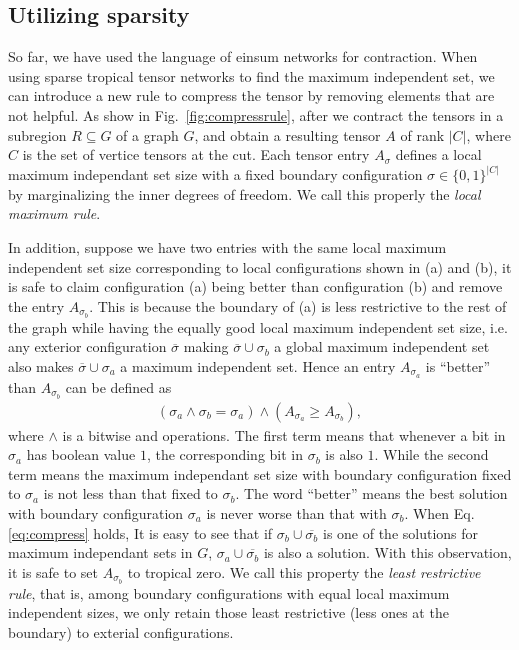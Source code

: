 \documentclass{article}
\newcommand{\<}{\langle}
\renewcommand{\>}{\rangle}
\newcommand{\Fig}[1]{Fig.~\ref{#1}}
\theoremstyle{definition}\newtheorem{definition}{\textit{Definition}}
\begin{document}
\subsection{Utilizing sparsity}
So far, we have used the language of einsum networks for contraction.
When using sparse tropical tensor networks to find the maximum independent set, we can introduce a new rule to compress the tensor by removing elements that are not helpful.
As show in \Fig{fig:compressrule}, after we contract the tensors in a subregion $R \subseteq G$ of a graph $G$, and obtain a resulting tensor $A$ of rank $|C|$, where $C$ is the set of vertice tensors at the cut.
Each tensor entry $A_{\sigma}$ defines a local maximum independant set size with a fixed boundary configuration $\sigma \in \{0,1\}^{|C|}$ by marginalizing the inner degrees of freedom.
We call this properly the \textit{local maximum rule}.

In addition, suppose we have two entries with the same local maximum independent set size corresponding to local configurations shown in (a) and (b), it is safe to claim configuration (a) being better than configuration (b) and remove the entry $A_{\sigma_b}$.
This is because the boundary of (a) is less restrictive to the rest of the graph while having the equally good local maximum independent set size, 
i.e. any exterior configuration $\overline{\sigma}$ making $\overline{\sigma} \cup \sigma_b$ a global maximum independent set also makes $\overline{\sigma} \cup \sigma_a$ a maximum independent set.
Hence an entry $A_{\sigma_a}$ is ``better'' than $A_{\sigma_b}$ can be defined as
\begin{align}
(\sigma_a \land \sigma_b = \sigma_a) \land (A_{\sigma_a} \geq A_{\sigma_b}),\label{eq:compress}
\end{align}
where $\land$ is a bitwise and operations.
The first term means that whenever a bit in $\sigma_a$ has boolean value $1$, the corresponding bit in $\sigma_b$ is also $1$.
While the second term means the maximum independant set size with boundary configuration fixed to $\sigma_a$ is not less than that fixed to $\sigma_b$.
The word ``better'' means the best solution with boundary configuration $\sigma_a$ is never worse than that with $\sigma_b$.
When Eq. \ref{eq:compress} holds, It is easy to see that if $\sigma_b \cup \overline{\sigma_b}$ is one of the solutions for maximum independant sets in $G$, $\sigma_a \cup \overline{\sigma_b}$ is also a solution.
With this observation, it is safe to set $A_{\sigma_b}$ to tropical zero.
We call this property the \textit{least restrictive rule}, that is,
among boundary configurations with equal local maximum independent sizes,
we only retain those least restrictive (less ones at the boundary) to exterial configurations.
\end{document}
